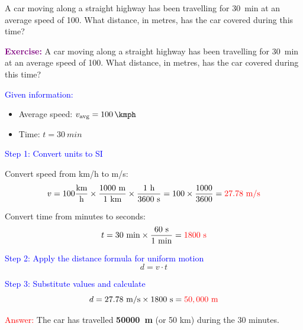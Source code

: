 \begin{exercise}
    A car moving along a straight highway has been travelling for \qty{30}{min} at an average speed of \qty{100}{\kmph}. What distance, in metres, has the car covered during this time?
    \begin{solu}
        \textbf{\textcolor{purple}{Exercise:}} A car moving along a straight highway has been travelling for \qty{30}{min} at an average speed of \qty{100}{\kmph}. What distance, in metres, has the car covered during this time?

        \vspace{0.3cm}

        \textcolor{blue}{Given information:}
        \begin{itemize}
            \item Average speed: $v_{\text{avg}} = \qty{100}{\kmph}$
            \item Time: $t = \qty{30}{min}$
        \end{itemize}

        \textcolor{blue}{Step 1: Convert units to SI}

        Convert speed from km/h to m/s:
        \[
            v = 100 \frac{\text{km}}{\text{h}} \times \frac{1000 \text{ m}}{1 \text{ km}} \times \frac{1 \text{ h}}{3600 \text{ s}} = 100 \times \frac{1000}{3600} = \textcolor{red}{27.78 \text{ m/s}}
        \]

        Convert time from minutes to seconds:
        \[
            t = 30 \text{ min} \times \frac{60 \text{ s}}{1 \text{ min}} = \textcolor{red}{1800 \text{ s}}
        \]

        \textcolor{blue}{Step 2: Apply the distance formula for uniform motion}
        \[
            \boxed{d = v \cdot t}
        \]

        \textcolor{blue}{Step 3: Substitute values and calculate}
        \[
            d = 27.78 \text{ m/s} \times 1800 \text{ s} = \textcolor{red}{50,000 \text{ m}}
        \]

        \textcolor{red}{Answer:} The car has travelled \textbf{\qty{50000}{\m}} (or 50 km) during the 30 minutes.
    \end{solu}
\end{exercise}


